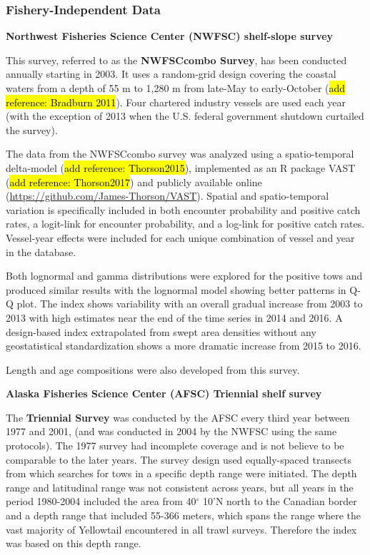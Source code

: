 \documentclass[12pt,]{article}
\begin{document}
\subsubsection{Fishery-Independent Data}\label{fishery-independent-data}

\textbf{Northwest Fisheries Science Center (NWFSC) shelf-slope survey}

This survey, referred to as the \textbf{NWFSCcombo Survey}, has been
conducted annually starting in 2003. It uses a random-grid design
covering the coastal waters from a depth of 55 m to 1,280 m from
late-May to early-October (\hl{add reference: Bradburn 2011}). Four
chartered industry vessels are used each year (with the exception of
2013 when the U.S. federal government shutdown curtailed the survey).

The data from the NWFSCcombo survey was analyzed using a spatio-temporal
delta-model (\hl{add reference: Thorson2015}), implemented as an R
package VAST (\hl{add reference: Thorson2017}) and publicly available
online (\url{https://github.com/James-Thorson/VAST}). Spatial and
spatio-temporal variation is specifically included in both encounter
probability and positive catch rates, a logit-link for encounter
probability, and a log-link for positive catch rates. Vessel-year
effects were included for each unique combination of vessel and year in
the database.

Both lognormal and gamma distributions were explored for the positive
tows and produced similar results with the lognormal model showing
better patterns in Q-Q plot. The index shows variability with an overall
gradual increase from 2003 to 2013 with high estimates near the end of
the time series in 2014 and 2016. A design-based index extrapolated from
swept area densities without any geostatistical standardization shows a
more dramatic increase from 2015 to 2016.

Length and age compositions were also developed from this survey.

\textbf{Alaska Fisheries Science Center (AFSC) Triennial shelf survey}

The \textbf{Triennial Survey} was conducted by the AFSC every third year
between 1977 and 2001, (and was conducted in 2004 by the NWFSC using the
same protocols). The 1977 survey had incomplete coverage and is not
believe to be comparable to the later years. The survey design used
equally-spaced transects from which searches for tows in a specific
depth range were initiated. The depth range and latitudinal range was
not consistent across years, but all years in the period 1980-2004
included the area from 40\(^\circ\) 10'N north to the Canadian border
and a depth range that included 55-366 meters, which spans the range
where the vast majority of Yellowtail encountered in all trawl surveys.
Therefore the index was based on this depth range.
\end{document}
